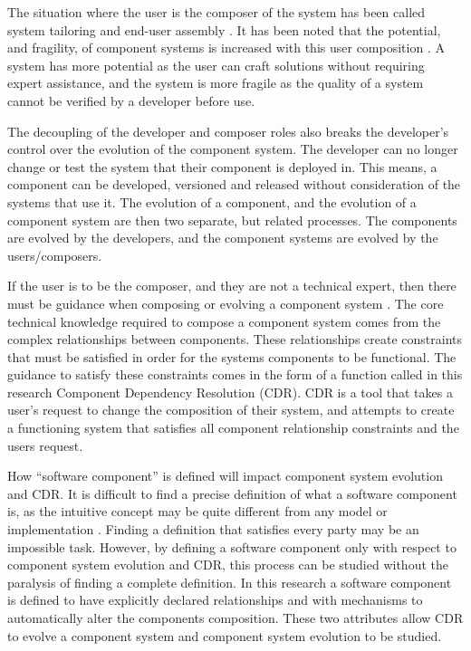 The situation where the user is the composer of the system has been called system tailoring \citep{Morch1997} and end-user assembly \citep{Szyperski2002}. 
It has been noted that the potential, and fragility, of component systems is increased with this user composition \citep{Szyperski2002}.
A system has more potential as the user can craft solutions without requiring expert assistance,
and the system is more fragile as the quality of a system cannot be verified by a developer before use.

The decoupling of the developer and composer roles also breaks the developer's control over the evolution of the component system.
The developer can no longer change or test the system that their component is deployed in.
This means, a component can be developed, versioned and released without consideration of the systems that use it.
The evolution of a component, and the evolution of a component system are then two separate, but related processes.
The components are evolved by the developers, and the component systems are evolved by the users/composers.

If the user is to be the composer, and they are not a technical expert, then there must be guidance when composing or evolving a component system \citep{Szyperski2002}.
The core technical knowledge required to compose a component system comes from the complex relationships between components.
These relationships create constraints that must be satisfied in order for the systems components to be functional.
The guidance to satisfy these constraints comes in the form of a function called in this research Component Dependency Resolution (CDR).
CDR is  a tool that takes a user's request to change the composition of their system, and attempts to create a functioning system 
that satisfies all component relationship constraints and the users request.

How ``software component'' is defined will impact component system evolution and CDR.
It is difficult to find a precise definition of what a software component is, as the intuitive concept may be quite different from any model or implementation \citep{Crnkovic2011}.
Finding a definition that satisfies every party may be an impossible task.
However, by defining a software component only with respect to component system evolution and CDR, 
this process can be studied without the paralysis of finding a complete definition.
In this research a software component is defined to have explicitly declared relationships and with mechanisms to automatically alter the components composition.
These two attributes allow CDR to evolve a component system and component system evolution to be studied. 

